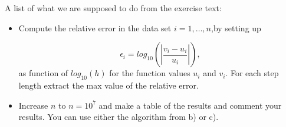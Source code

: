 
A list of what we are supposed to do from the exercise text:

\begin{itemize}

\item Compute the relative error  in the data set $i=1,\dots, n$,by setting up

\[
   \epsilon_i=log_{10}\left(\left|\frac{v_i-u_i}
                 {u_i}\right|\right),
\]
as function of $log_{10}(h)$ for the function values $u_i$ and $v_i$.
For each step length extract the max value of the relative error.  

\item Increase $n$ to $n=10^7$ and make a table of the results and 
comment your results. You can use either the algorithm from b) or c). 
\end{itemize}


